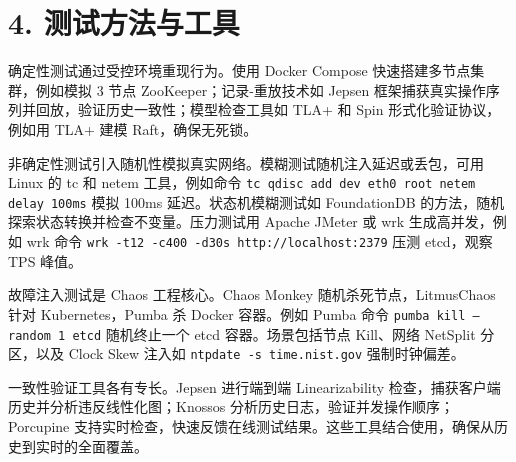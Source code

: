 \chapter{4. 测试方法与工具}
确定性测试通过受控环境重现行为。使用 Docker Compose 快速搭建多节点集群，例如模拟 3 节点 ZooKeeper；记录-重放技术如 Jepsen 框架捕获真实操作序列并回放，验证历史一致性；模型检查工具如 TLA+ 和 Spin 形式化验证协议，例如用 TLA+ 建模 Raft，确保无死锁。\par
非确定性测试引入随机性模拟真实网络。模糊测试随机注入延迟或丢包，可用 Linux 的 tc 和 netem 工具，例如命令 \texttt{tc qdisc add dev eth0 root netem delay 100ms} 模拟 100ms 延迟。状态机模糊测试如 FoundationDB 的方法，随机探索状态转换并检查不变量。压力测试用 Apache JMeter 或 wrk 生成高并发，例如 wrk 命令 \texttt{wrk -t12 -c400 -d30s http://localhost:2379} 压测 etcd，观察 TPS 峰值。\par
故障注入测试是 Chaos 工程核心。Chaos Monkey 随机杀死节点，LitmusChaos 针对 Kubernetes，Pumba 杀 Docker 容器。例如 Pumba 命令 \texttt{pumba kill --random 1 etcd} 随机终止一个 etcd 容器。场景包括节点 Kill、网络 NetSplit 分区，以及 Clock Skew 注入如 \texttt{ntpdate -s time.nist.gov} 强制时钟偏差。\par
一致性验证工具各有专长。Jepsen 进行端到端 Linearizability 检查，捕获客户端历史并分析违反线性化图；Knossos 分析历史日志，验证并发操作顺序；Porcupine 支持实时检查，快速反馈在线测试结果。这些工具结合使用，确保从历史到实时的全面覆盖。\par
